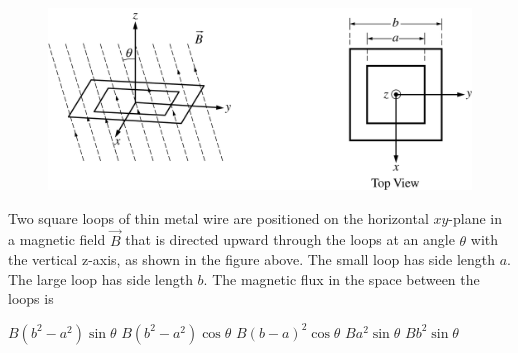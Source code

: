 \begin{figure}[H]
\centering
\includegraphics[scale=0.25]{images/img-014-040.png}
\end{figure}

\begin{questions}\setcounter{question}{32}\question
Two square loops of thin metal wire are positioned on the horizontal $x y$-plane in a magnetic field $\vec{B}$ that is directed upward through the loops at an angle $\theta$ with the vertical z-axis, as shown in the figure above. The small loop has side length $a$. The large loop has side length $b$. The magnetic flux in the space between the loops is

\begin{oneparchoices}
\choice $B\left(b^{2}-a^{2}\right) \sin \theta$
\choice $B\left(b^{2}-a^{2}\right) \cos \theta$
\choice $B(b-a)^{2} \cos \theta$
\choice $B a^{2} \sin \theta$
\choice $B b^{2} \sin \theta$
\end{oneparchoices}\end{questions}


